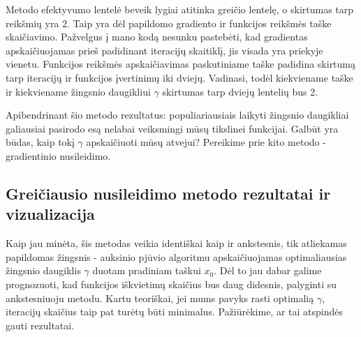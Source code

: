 \documentclass{article}
\begin{document}
Metodo efektyvumo lentelė beveik lygiai atitinka greičio lentelę, o skirtumas tarp reikšmių yra 2. Taip yra dėl papildomo gradiento ir funkcijos reikšmės taške skaičiavimo. Pažvelgus į mano kodą nesunku pastebėti, kad gradientas apskaičiuojamas prieš padidinant iteracijų skaitiklį, jis visada yra priekyje vienetu. Funkcijos reikšmės apskaičiavimas paskutiniame taške padidina skirtumą tarp iteracijų ir funkcijos įvertinimų iki dviejų. Vadinasi, todėl kiekviename taške ir kiekviename žingsnio daugikliui $\gamma$ skirtumas tarp dviejų lentelių bus 2.

Apibendrinant šio metodo rezultatus: populiariausiais laikyti žingsnio daugikliai galiausiai pasirodo esą nelabai veiksmingi mūsų tikslinei funkcijai. Galbūt yra būdas, kaip tokį $\gamma$ apskaičiuoti mūsų atvejui? Pereikime prie kito metodo - gradientinio nusileidimo.
\subsection{Greičiausio nusileidimo metodo rezultatai ir vizualizacija}
Kaip jau minėta, šis metodas veikia identiškai kaip ir ankstesnis, tik atliekamas papildomas žingsnis - auksinio pjūvio algoritmu apskaičiuojamas optimaliausias žingsnio daugiklis $\gamma$ duotam pradiniam taškui $x_{0}$. Dėl to jau dabar galime prognozuoti, kad funkcijos iškvietimų skaičius bus daug didesnis, palyginti su ankstesniuoju metodu. Kartu teoriškai, jei mums pavyks rasti optimalią $\gamma$, iteracijų skaičius taip pat turėtų būti minimalus. Pažiūrėkime, ar tai atspindės gauti rezultatai.
\end{document}

